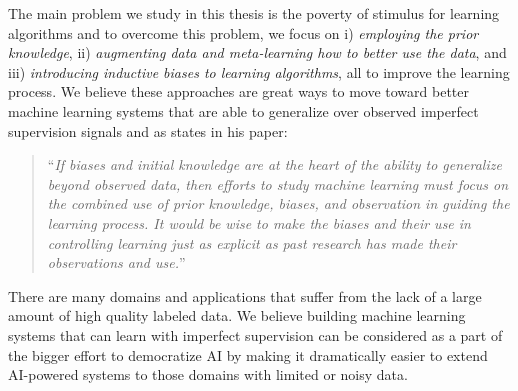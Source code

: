 \medskip

The main problem we study in this thesis is the poverty of stimulus for learning algorithms and to overcome this problem, we focus on  i) \emph{employing the prior knowledge}, ii) \emph{augmenting data and meta-learning how to better use the data}, and iii) \emph{introducing inductive biases to learning algorithms}, all to improve the learning process. We believe these approaches are great ways to move toward better machine learning systems that are able to generalize over observed imperfect supervision signals and as \citet{Mitchell80theneed} states in his paper:
\begin{quote}
``\emph{If biases and initial knowledge are at the heart of the ability to generalize beyond observed data, then efforts to study machine learning must focus on the combined use of prior knowledge, biases, and observation in guiding the learning process. It would be wise to make the biases and their use in controlling learning just as explicit as past research has made their observations and use.}''
\end{quote}

There are many domains and applications that suffer from the lack of a large amount of high quality labeled data. We believe building machine learning systems that can learn with imperfect supervision can be considered as a part of the bigger effort to democratize AI by making it dramatically easier to extend AI-powered systems to those domains with limited or noisy data.


